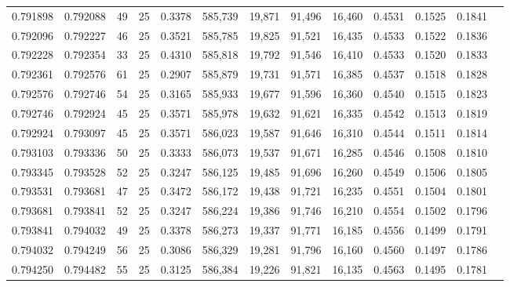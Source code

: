 \begin{tabular}{rrrrrrrrrrrrr}
0.791898 & 0.792088 &    49 &  25 &                                     0.3378 & 585,739 &  19,871 &  91,496 &  16,460 & 0.4531 & 0.1525 & 0.1841 \\
0.792096 & 0.792227 &    46 &  25 &                                     0.3521 & 585,785 &  19,825 &  91,521 &  16,435 & 0.4533 & 0.1522 & 0.1836 \\
0.792228 & 0.792354 &    33 &  25 &                                     0.4310 & 585,818 &  19,792 &  91,546 &  16,410 & 0.4533 & 0.1520 & 0.1833 \\
0.792361 & 0.792576 &    61 &  25 &                                     0.2907 & 585,879 &  19,731 &  91,571 &  16,385 & 0.4537 & 0.1518 & 0.1828 \\
0.792576 & 0.792746 &    54 &  25 &                                     0.3165 & 585,933 &  19,677 &  91,596 &  16,360 & 0.4540 & 0.1515 & 0.1823 \\
0.792746 & 0.792924 &    45 &  25 &                                     0.3571 & 585,978 &  19,632 &  91,621 &  16,335 & 0.4542 & 0.1513 & 0.1819 \\
0.792924 & 0.793097 &    45 &  25 &                                     0.3571 & 586,023 &  19,587 &  91,646 &  16,310 & 0.4544 & 0.1511 & 0.1814 \\
0.793103 & 0.793336 &    50 &  25 &                                     0.3333 & 586,073 &  19,537 &  91,671 &  16,285 & 0.4546 & 0.1508 & 0.1810 \\
0.793345 & 0.793528 &    52 &  25 &                                     0.3247 & 586,125 &  19,485 &  91,696 &  16,260 & 0.4549 & 0.1506 & 0.1805 \\
0.793531 & 0.793681 &    47 &  25 &                                     0.3472 & 586,172 &  19,438 &  91,721 &  16,235 & 0.4551 & 0.1504 & 0.1801 \\
0.793681 & 0.793841 &    52 &  25 &                                     0.3247 & 586,224 &  19,386 &  91,746 &  16,210 & 0.4554 & 0.1502 & 0.1796 \\
0.793841 & 0.794032 &    49 &  25 &                                     0.3378 & 586,273 &  19,337 &  91,771 &  16,185 & 0.4556 & 0.1499 & 0.1791 \\
0.794032 & 0.794249 &    56 &  25 &                                     0.3086 & 586,329 &  19,281 &  91,796 &  16,160 & 0.4560 & 0.1497 & 0.1786 \\
0.794250 & 0.794482 &    55 &  25 &                                     0.3125 & 586,384 &  19,226 &  91,821 &  16,135 & 0.4563 & 0.1495 & 0.1781 \\

\end{tabular}
